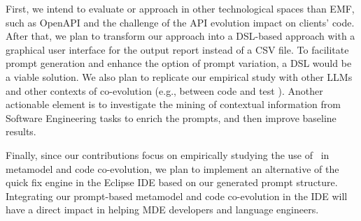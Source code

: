 First, we intend to evaluate or approach in other technological spaces than EMF, such as OpenAPI and the challenge of the API evolution impact on clients' code. After that, we plan to transform our approach into a DSL-based approach with a graphical user interface for the output report instead of a CSV file. To facilitate prompt generation and enhance the option of prompt variation, a DSL would be a viable solution. We also plan to replicate our empirical study with other LLMs and other contexts of co-evolution (e.g., between code and test \cite{le2021untangling}).  Another actionable element is to investigate the mining of contextual information from Software Engineering tasks to enrich the prompts, and then improve baseline results.

Finally, since our contributions focus on empirically studying the use of \LLM~in metamodel and code co-evolution, we plan to implement an alternative of the quick fix engine in the Eclipse IDE based on our generated prompt structure. Integrating our prompt-based metamodel and code co-evolution in the IDE will have a direct impact in helping MDE developers and language engineers. 
